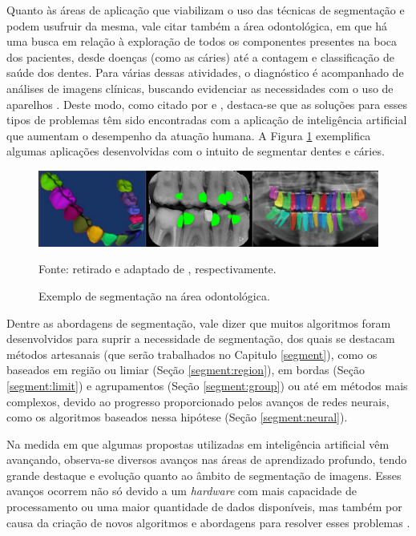 Quanto às áreas de aplicação que viabilizam o uso das técnicas de segmentação e podem usufruir da mesma, vale citar também a área odontológica, em que há uma busca em relação à exploração de todos os componentes presentes na boca dos pacientes, desde doenças (como as cáries) até a contagem e classificação de saúde dos dentes. Para várias dessas atividades, o diagnóstico é acompanhado de análises de imagens clínicas, buscando evidenciar as necessidades com o uso de aparelhos \citep{Schwendicke2020}. Deste modo, como citado por \cite{Bansal2021, Nguyen2021} e \cite{Schwendicke2020}, destaca-se que as soluções para esses tipos de problemas têm sido encontradas com a aplicação de inteligência artificial que aumentam o desempenho da atuação humana. A Figura \ref{intro:fig:4} exemplifica algumas aplicações desenvolvidas com o intuito de segmentar dentes e cáries.

\begin{figure}[H]
    \centering
    \caption{Exemplo de segmentação na área odontológica.}
    \includegraphics[width=1\linewidth]{recursos/imagens/introduction/odonto_segmentation.png}
    \label{intro:fig:4}

    Fonte: retirado e adaptado de \cite{Shuai2016,Bayrakdar2021,Gil2019}, respectivamente.
\end{figure}

Dentre as abordagens de segmentação, vale dizer que muitos algoritmos foram desenvolvidos para suprir a necessidade de segmentação, dos quais se destacam métodos artesanais (que serão trabalhados no Capitulo \ref{segment}), como os baseados em região ou limiar (Seção \ref{segment:region}), em bordas (Seção \ref{segment:limit}) e agrupamentos (Seção \ref{segment:group}) ou até em métodos mais complexos, devido ao progresso proporcionado pelos avanços de redes neurais, como os algoritmos baseados nessa hipótese (Seção \ref{segment:neural}).

Na medida em que algumas propostas utilizadas em inteligência artificial vêm avançando, observa-se diversos avanços nas áreas de aprendizado profundo, tendo grande destaque e evolução quanto ao âmbito de segmentação de imagens. Esses avanços ocorrem não só devido a um \textit{hardware} com mais capacidade de processamento ou uma maior quantidade de dados disponíveis, mas também por causa da criação de novos algoritmos e abordagens para resolver esses problemas \citep{Szegedy2015}.

